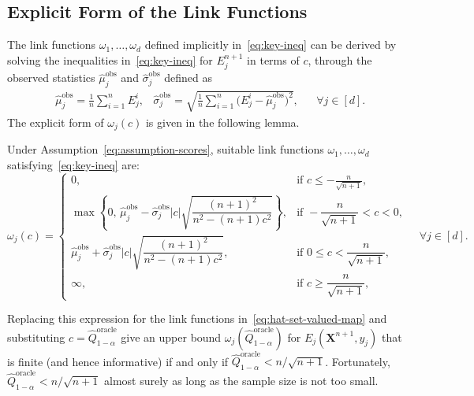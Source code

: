 {\color{blue}
\subsection{Explicit Form of the Link Functions}
The link functions $\omega_1, \ldots, \omega_d$ defined implicitly in~\eqref{eq:key-ineq} can be derived by solving the inequalities in~\eqref{eq:key-ineq} for ${E}^{n+1}_j$ in terms of $c$, through the observed statistics $\hat{\mu}^\mathrm{obs}_j$ and $\hat{\sigma}^\mathrm{obs}_j$ defined as
\begin{equation} \label{eq:plug-in-mean-std}
\begin{aligned}
& \hat{\mu}^\mathrm{obs}_j = \frac{1}{n} \sum_{i=1}^{n} {E}^i_j,
& \hat{\sigma}^\mathrm{obs}_j =  \sqrt{\frac{1}{n} \sum_{i=1}^{n} \!\bigl({E}^i_j - \hat{\mu}^\mathrm{obs}_j\bigr)^2},
&& \forall j \in [d].
\end{aligned}
\end{equation}
The explicit form of $\omega_j(c)$ is given in the following lemma.}

\begin{lemma}\label{lem:solution-key-ineq}
Under Assumption~\ref{eq:assumption-scores}, suitable link functions $\omega_1, \ldots ,\omega_d$ satisfying~\eqref{eq:key-ineq} are:
\[
    \omega_j(c)
    =
    \begin{cases}
    0, & \text{if } c \leq -\frac{n}{\sqrt{n+1}},\\
    \max\!\left\{0,\,
    \hat{\mu}^\mathrm{obs}_j - \hat{\sigma}^\mathrm{obs}_j |c|
    \sqrt{\dfrac{(n+1)^2}{n^2 - (n+1)c^2}}\right\},
    & \text{if } -\dfrac{n}{\sqrt{n+1}} < c < 0, \\[1.1em]
    \hat{\mu}^\mathrm{obs}_j + \hat{\sigma}^\mathrm{obs}_j |c|
    \sqrt{\dfrac{(n+1)^2}{n^2 - (n+1)c^2}},
    & \text{if } 0 \le c < \dfrac{n}{\sqrt{n+1}}, \\[1.1em]
    \infty, & \text{if } c \ge \dfrac{n}{\sqrt{n+1}},
    \end{cases}\quad\forall j \in [d].
\]
\end{lemma}

Replacing this expression for the link functions in~\eqref{eq:hat-set-valued-map} and substituting $c = \hat{Q}^{\mathrm{oracle}}_{1-\alpha}$ give an upper bound $\omega_j(\hat{Q}^{\mathrm{oracle}}_{1-\alpha})$ for $E_j(\mathbf{X}^{n+1}, y_j)$ that is finite (and hence informative) if and only if $\hat{Q}^{\mathrm{oracle}}_{1-\alpha} <n/\sqrt{n+1}$. Fortunately, $\hat{Q}^{\mathrm{oracle}}_{1-\alpha} <n/\sqrt{n+1}$ almost surely as long as the sample size is not too small.

